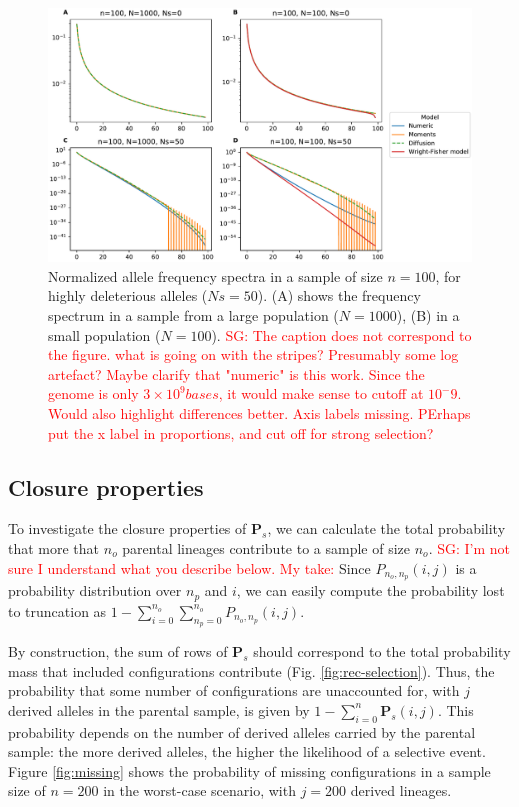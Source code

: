 \documentclass[review]{elsarticle}
\newcommand{\sgcomment}[1]{\textcolor{red}{SG: #1}}
\begin{document}
\begin{figure}
  \centering
  \includegraphics[width=0.7\textheight]{fig/strong_selection_four_panel.pdf}
  \caption{Normalized allele frequency spectra in a sample of size $n=100$, for highly deleterious
    alleles ($Ns=50$). (A) shows the frequency spectrum in a sample from a large population
    ($N=1000$), (B) in a small population ($N=100$). \sgcomment{The caption does not correspond to the figure.
    what is going on with the stripes? Presumably some log artefact? Maybe clarify that "numeric" is this work. Since the genome is only $3\times10^9 bases$, it would make sense to cutoff at $10^-9$. Would also highlight differences better. Axis labels missing. PErhaps put the x label in proportions, and cut off for strong selection?}
    \label{fig:strong-selection}
   }
 
\end{figure}


\subsection{Closure properties}
\label{subsec:closure}

To investigate the closure properties of $\mathbf{P}_s$, we can calculate the total probability that
more that $n_o$ parental lineages contribute to a sample of size $n_o$. \sgcomment{I'm not sure
 I understand what you describe below. My take:}
Since $P_{n_o,n_p}(i,j)$ is a probability distribution over $n_p$ and $i$, we can easily compute the probability lost to 
truncation as $1-\sum_{i=0}^{n_o} \sum_{n_p=0}^{n_o}{P_{n_o,n_p}(i,j)}$. 


By construction, the sum
of rows of $\mathbf{P}_s$ should correspond to the total probability mass that included
configurations contribute (Fig. \ref{fig:rec-selection}). Thus, the probability that some number of
configurations are unaccounted for, with $j$ derived alleles in the parental sample, is given by
$1-\sum_{i=0}^{n}\mathbf{P}_s(i,j)$. This probability depends on the number of derived alleles
carried by the parental sample: the more derived alleles, the higher the likelihood of a selective
event. Figure \ref{fig:missing} shows the probability of missing configurations in a sample size of
$n=200$ in the worst-case scenario, with $j=200$ derived lineages.
\end{document}
